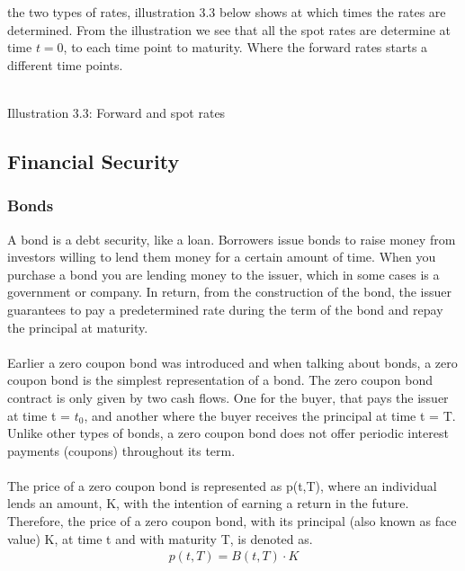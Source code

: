 the two types of rates, illustration 3.3  below shows at which times the rates are determined. From the illustration
we see that all the spot rates are determine at time $t=0$, to each time point to maturity. Where the forward rates starts
a different time points. 
\\
\begin{center}
    \\[10pt] 
    Illustration 3.3: Forward and spot rates
\end{center}
\newpage
\subsection{Financial Security}
\subsubsection{Bonds}
A bond is a debt security, like a loan. Borrowers issue bonds to raise money 
from investors willing to lend them money for a certain amount of time.
When you purchase a bond you are lending money to the issuer, which in 
some cases is a government or company. In return, from the construction of the 
bond, the issuer guarantees to pay a predetermined rate during the term of the bond
and repay the principal at maturity. 
\\\\
Earlier a zero coupon bond was introduced and when talking about bonds, a zero coupon 
bond is the simplest representation of a bond. The zero coupon bond contract is 
only given by two cash flows. One for the buyer, that pays the issuer at time 
t = $t_0$, and another where the buyer receives the principal at time t = T.
Unlike other types of bonds, a zero coupon bond does not offer periodic 
interest payments (coupons) throughout its term. \cite{Bjork} 
\\\\
The price of a zero coupon bond is represented as 
p(t,T), where an individual lends an amount, K, with the intention of earning a
return in the future. Therefore, the price of a zero coupon bond, with 
its principal (also known as face value) K, at time t and with maturity 
T, is denoted as.
\begin{align*}
    p(t,T)= B(t,T)\cdot K
\end{align*}
